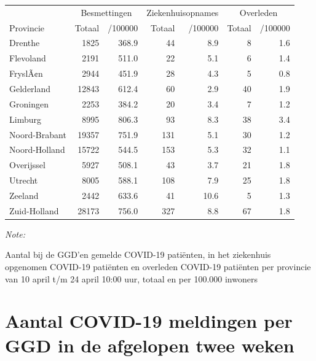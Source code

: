 \documentclass[
  english,
  man,floatsintext]{apa6}
\begin{document}
\begin{table}
\centering
\begin{threeparttable}
\begin{tabular}{lrrrrrr}
\toprule
\multicolumn{1}{c}{ } & \multicolumn{2}{c}{Besmettingen} & \multicolumn{2}{c}{Ziekenhuisopnames} & \multicolumn{2}{c}{Overleden} \\
\cmidrule(l{3pt}r{3pt}){2-3} \cmidrule(l{3pt}r{3pt}){4-5} \cmidrule(l{3pt}r{3pt}){6-7}
Provincie & Totaal & /100000 & Totaal & /100000 & Totaal & /100000\\
\midrule
Drenthe & 1825 & 368.9 & 44 & 8.9 & 8 & 1.6\\
Flevoland & 2191 & 511.0 & 22 & 5.1 & 6 & 1.4\\
FryslÃ¢n & 2944 & 451.9 & 28 & 4.3 & 5 & 0.8\\
Gelderland & 12843 & 612.4 & 60 & 2.9 & 40 & 1.9\\
Groningen & 2253 & 384.2 & 20 & 3.4 & 7 & 1.2\\
Limburg & 8995 & 806.3 & 93 & 8.3 & 38 & 3.4\\
Noord-Brabant & 19357 & 751.9 & 131 & 5.1 & 30 & 1.2\\
Noord-Holland & 15722 & 544.5 & 153 & 5.3 & 32 & 1.1\\
Overijssel & 5927 & 508.1 & 43 & 3.7 & 21 & 1.8\\
Utrecht & 8005 & 588.1 & 108 & 7.9 & 25 & 1.8\\
Zeeland & 2442 & 633.6 & 41 & 10.6 & 5 & 1.3\\
Zuid-Holland & 28173 & 756.0 & 327 & 8.8 & 67 & 1.8\\
\bottomrule
\end{tabular}
\begin{tablenotes}
\item \textit{Note: } 
\item Aantal bij de GGD’en gemelde COVID-19 patiënten, in het ziekenhuis opgenomen COVID-19 patiënten en overleden COVID-19 patiënten per provincie van 10 april t/m 24 april 10:00 uur, totaal en per 100.000 inwoners
\end{tablenotes}
\end{threeparttable}
\end{table}

\newpage

\hypertarget{aantal-covid-19-meldingen-per-ggd-in-de-afgelopen-twee-weken}{%
\section{Aantal COVID-19 meldingen per GGD in de afgelopen twee weken}\label{aantal-covid-19-meldingen-per-ggd-in-de-afgelopen-twee-weken}}
\end{document}
